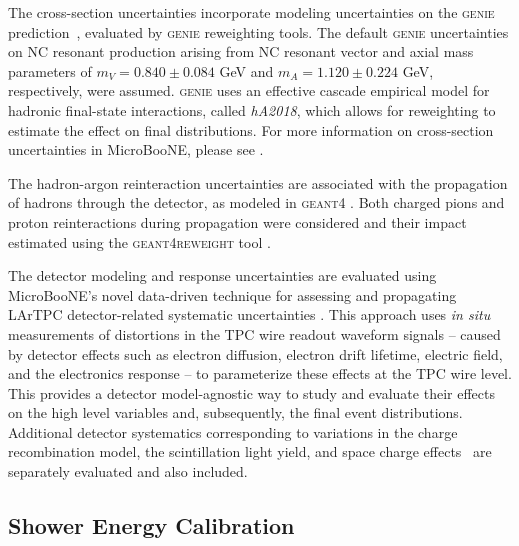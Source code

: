 The cross-section uncertainties incorporate modeling uncertainties on the \textsc{genie} prediction~\cite{MicroBooNE:2021ccs,Andreopoulos:2009rq,GENIE:2021zuu}, evaluated by \textsc{genie} reweighting tools. The default \textsc{genie} uncertainties on NC resonant production arising from NC resonant vector and axial mass parameters of $m_V = 0.840 \pm 0.084 $ GeV and $m_A = 1.120 \pm 0.224 $ GeV, respectively, were assumed.  \textsc{genie} uses an effective cascade empirical model for hadronic final-state interactions, called \emph{hA2018}, which allows for reweighting to estimate the effect on final distributions. For more information on cross-section uncertainties in MicroBooNE, please see \cite{MicroBooNE:2021ccs}.

The hadron-argon reinteraction uncertainties are associated with the propagation of hadrons through the detector, as modeled in \textsc{geant4} \cite{GEANT4:2002zbu}. Both charged pions and proton reinteractions during propagation were considered and their impact estimated using the \textsc{geant4reweight} tool \cite{Calcutt:2021zck}.

The detector modeling and response uncertainties are evaluated using MicroBooNE's novel data-driven technique for assessing and propagating LArTPC detector-related systematic uncertainties \cite{MicroBooNE:2021roa}. This approach uses \textit{in situ} measurements of distortions in the TPC wire readout waveform signals -- caused by detector effects such as electron diffusion, electron drift lifetime, electric field, and the electronics response -- to parameterize these effects at the TPC wire level. This provides a detector model-agnostic way to study and evaluate their effects on the high level variables and, subsequently, the final event distributions. Additional detector systematics corresponding to variations in the charge recombination model, the scintillation light yield, and space charge effects~\cite{MicroBooNE:2019koz,MicroBooNE:2020kca} are separately evaluated and also included.

\subsection{Shower Energy Calibration} 

